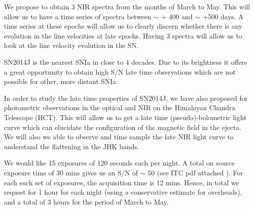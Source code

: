 \documentclass[11pt]{article}
\begin{document}

%

\expdesign    %

We propose to obtain 3 NIR spectra from the months of March to May. This will allow us to have  a time series of spectra between $\sim$ + 400 and $\sim$ +500 days. A time series at these epochs will allow us to clearly discern whether there is any evolution in the line velocities at late epochs. 
Having 3 spectra will allow us to look at the line velocity evolution in the SN. 

SN2014J is the nearest SNIa in close to 4 decades. Due to its brightness it offers a great opportunity to obtain high S/N late time observations which are not possible for other, more distant SNIa.

In order to study the late time properties of SN2014J, we have also proposed for photometric observations in the optical and NIR on the Himalayan Chandra Telescope (HCT). This will allow us to get a late time (pseudo)-bolometric light curve which can elucidate the configuration of the magnetic field in the ejecta. We will also we able to observe and time sample the late NIR light curve to understand the flattening in the JHK bands. 

%

\technicaldescription    %
We would like 15 exposures of 120 seconds  each per night. A total on source exposure time of 30 mins gives us an S/N of $\sim$ 50 (see ITC pdf attached ). For each such set of  exposures, the acquisition time is 12 mins. 
Hence, in total we request for 1 hour for each night (using a conservative estimate for overheads), and a total of 3 hours for the period of March to May. 
\end{document}

